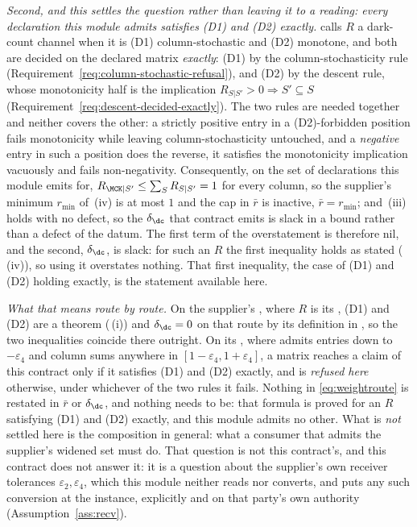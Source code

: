 \begin{remark}
\emph{Second, and this settles the question rather than leaving it to a
reading: every declaration this module admits satisfies (D1) and (D2)
exactly.}  calls $R$ a
dark-count channel when it is (D1) column-stochastic and (D2) monotone, and
both are decided on the declared matrix \emph{exactly}: (D1) by the
column-stochasticity rule (Requirement~\ref{req:column-stochastic-refusal}),
and (D2) by the descent rule, whose monotonicity half is the implication
$R_{S|S'}>0\Rightarrow S'\subseteq S$
(Requirement~\ref{req:descent-decided-exactly}). The two rules are needed
together and neither covers the other: a strictly positive entry in a
(D2)-forbidden position fails monotonicity while leaving column-stochasticity
untouched, and a \emph{negative} entry in such a position does the reverse, it
satisfies the monotonicity implication vacuously and fails non-negativity.
Consequently, on the set of declarations this module emits for,
$R_{\MCK|S'}\le\sum_SR_{S|S'}=1$ for every column, so the supplier's minimum
$r_{\min}$ of \,(iv) is
at most $1$ and the cap in $\bar r$ is inactive, $\bar r=r_{\min}$; and
\,(iii) holds with no
defect, so the $\delta_{\dc}$ that contract emits is slack in a bound rather
than a defect of the datum. The first term of the overstatement is therefore
nil, and the second, $\delta_{\dc}$, is slack: for such an $R$ the first
inequality holds as stated
(\,(iv)), so using it
overstates nothing. That first inequality, the case of (D1) and (D2) holding
exactly, is the statement available here.

\emph{What that means route by route.} On the supplier's
, where $R$ is its
, (D1) and (D2) are a theorem
(\,(i)) and
$\delta_{\dc}=0$ on that route by its definition in
, so the two
inequalities coincide there outright. On its , where
 admits entries down to
$-\varepsilon_4$ and column sums anywhere in
$[1-\varepsilon_4,1+\varepsilon_4]$, a matrix reaches a claim of this contract
only if it satisfies (D1) and (D2) exactly, and is \emph{refused here}
otherwise, under whichever of the two rules it fails. Nothing in
\eqref{eq:weightroute} is restated in $\bar r$ or $\delta_{\dc}$, and nothing
needs to be: that formula is proved for an $R$ satisfying (D1) and (D2)
exactly, and this module admits no other. What is \emph{not} settled here is
the composition in general: what a consumer that admits the supplier's widened
set must do. That question is not this contract's, and this contract does not
answer it: it is a question about the supplier's own receiver tolerances
$\varepsilon_2,\varepsilon_4$, which this module neither reads nor converts,
and  puts any such conversion at the
instance, explicitly and on that party's own authority
(Assumption~\ref{ass:recv}).
\end{remark}
